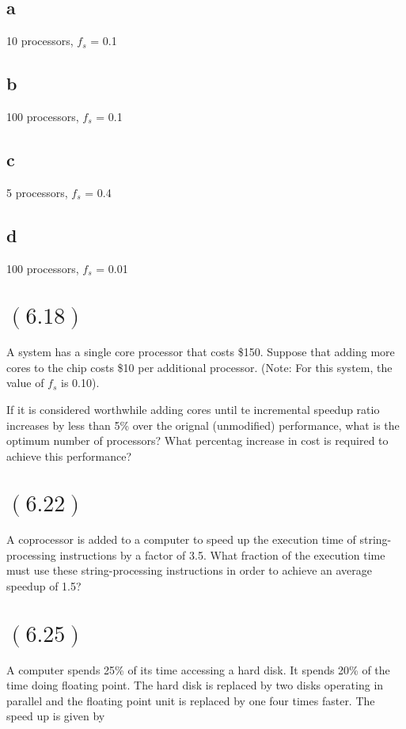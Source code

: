 \documentclass[letterpaper,12pt,titlepage]{article}
\begin{document}
\subsection*{a} 10 processors, $f_s$ = 0.1
\subsection*{b} 100 processors, $f_s$ = 0.1
\subsection*{c} 5 processors, $f_s$ = 0.4
\subsection*{d} 100 processors, $f_s$ = 0.01

\begin{mdframed}[style=MyFrame]
\end{mdframed}

\section*{$(6.18)$} A system has a single core processor that costs \$150. Suppose that adding more cores to the chip costs \$10 per additional processor. (Note: For this system, the value of $f_s$ is 0.10).

If it is considered worthwhile adding cores until te incremental speedup ratio increases by less than 5\% over the orignal (unmodified) performance, what is the optimum number of processors? What percentag increase in cost is required to achieve this performance?

\begin{mdframed}[style=MyFrame]
\end{mdframed}

\section*{$(6.22)$} A coprocessor is added to a computer to speed up the execution time of string-processing instructions by a factor of 3.5. What fraction of the execution time must use these string-processing instructions in order to achieve an average speedup of 1.5?

\begin{mdframed}[style=MyFrame]
\end{mdframed}

\section*{$(6.25)$} A computer spends 25\% of its time accessing a hard disk. It spends 20\% of the time doing floating point. The hard disk is replaced by two disks operating in parallel and the floating point unit is replaced by one four times faster. The speed up is given by
\end{document}

